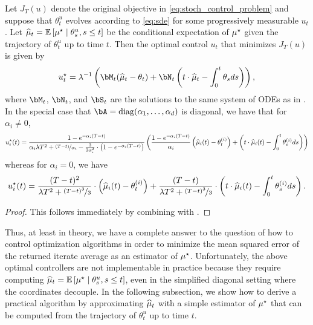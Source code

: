 \begin{corollary}\label{cor:optimal_control_unknown_mustar}
    Let $J_T(u)$ denote the original objective in \eqref{eq:stoch_control_problem} and suppose that $\theta_t^u$ evolves according to \eqref{eq:sde} for some progressively measurable $u_t$.  Let $\widehat{\mu}_t = \mathbb{E}\left[ \mu^{\star} \mid \theta_s^u, s \leq t \right]$ be the conditional expectation of $\mu^{\star}$ given the trajectory of $\theta_t^u$ up to time $t$.  Then the optimal control $u_t$ that minimizes $J_T(u)$ is given by
    \begin{align}
        \ustar_t =  \lambda^{-1} \left( \bM_t (\muhat_t - \theta_t) + \bN_t \left(t \cdot \muhat_t  - \int_0^t \theta_s d s \right) \right),
    \end{align}
    where $\bM_t$, $\bN_t$, and $\bS_t$ are the solutions to the same system of ODEs as in .  In the special case that $\bA = \diag(\alpha_1, \dots, \alpha_d)$ is diagonal, we have that for $\alpha_i \neq 0$,
    \begin{align}
        u^{\star}_i(t) = \frac{1 - e^{- \alpha_i (T - t)}}{\alpha_i \lambda T^2 + \nicefrac{(T - t)}{\alpha_i} - \frac{3}{2 \alpha_i^2} \cdot \left( 1 - e^{- \alpha_i (T - t)} \right)} \left( \frac{1 - e^{- \alpha_i (T -t)}}{\alpha_i} \left( \widehat{\mu}_i(t) - \theta_t^{(i)} \right) + \left(t \cdot \widehat{\mu}_i(t) - \int_0^t  \theta_s^{(i)}  d s\right)\right)
    \end{align}
    whereas for $\alpha_i = 0$, we have
    \begin{align}
        u^{\star}_i(t) = \frac{(T - t)^2}{\lambda T^2 + \nicefrac{(T - t)^3}{3}} \cdot \left( \widehat{\mu}_i(t) - \theta_t^{(i)} \right) + \frac{(T - t)}{\lambda T^2 + \nicefrac{(T - t)^3}{3}} \cdot \left(t \cdot \widehat{\mu}_i(t) - \int_0^t \theta_s^{(i)}  d s \right).
    \end{align}
\end{corollary}
\begin{proof}
    This follows immediately by combining  with .
\end{proof}

Thus, at least in theory, we have a complete answer to the question of how to control optimization algorithms in order to minimize the mean squared error of the returned iterate average as an estimator of $\mu^{\star}$.  Unfortunately, the above optimal controllers are not implementable in practice because they require computing $\widehat{\mu}_t = \mathbb{E}\left[ \mu^{\star} \mid \theta_s^u, s \leq t \right]$, even in the simplified diagonal setting where the coordinates decouple.  In the following subsection, we show how to derive a practical algorithm by approximating $\widehat{\mu}_t$ with a simple estimator of $\mu^{\star}$ that can be computed from the trajectory of $\theta_t^u$ up to time $t$.

